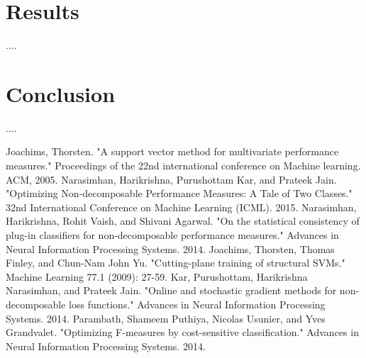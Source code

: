 \documentclass{article} %
\begin{document}
\section{Results}

....


\section{Conclusion}

....

\begin{thebibliography}{99}
	
	 Joachims, Thorsten. "A support vector method for multivariate performance measures." Proceedings of the 22nd international conference on Machine learning. ACM, 2005.
	 Narasimhan, Harikrishna, Purushottam Kar, and Prateek Jain. "Optimizing Non-decomposable Performance Measures: A Tale of Two Classes." 32nd International Conference on Machine Learning (ICML). 2015.
	 Narasimhan, Harikrishna, Rohit Vaish, and Shivani Agarwal. "On the statistical consistency of plug-in classifiers for non-decomposable performance measures." Advances in Neural Information Processing Systems. 2014.
	 Joachims, Thorsten, Thomas Finley, and Chun-Nam John Yu. "Cutting-plane training of structural SVMs." Machine Learning 77.1 (2009): 27-59.
	 Kar, Purushottam, Harikrishna Narasimhan, and Prateek Jain. "Online and stochastic gradient methods for non-decomposable loss functions." Advances in Neural Information Processing Systems. 2014.
	 Parambath, Shameem Puthiya, Nicolas Usunier, and Yves Grandvalet. "Optimizing F-measures by cost-sensitive classification." Advances in Neural Information Processing Systems. 2014.
	
\end{thebibliography}
\end{document}
